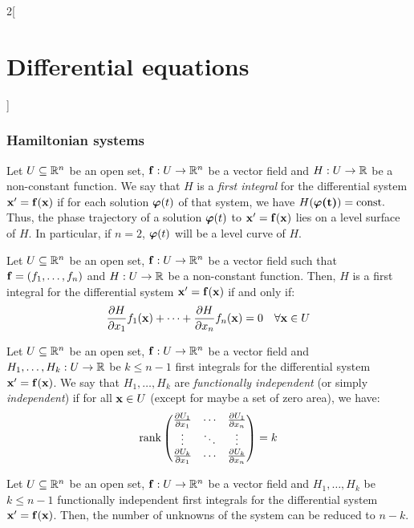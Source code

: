\documentclass[../../../main_math.tex]{subfiles}
\begin{document}
\begin{multicols}{2}[\section{Differential equations}]
  \subsubsection{Hamiltonian systems}
  \begin{definition}
    Let $U\subseteq \mathbb{R}^n$ be an open set, $\boldsymbol{\mathrm{f}}:U\rightarrow\mathbb{R}^n$ be a vector field and $H:U\rightarrow\mathbb{R}$ be a non-constant function. We say that $H$ is a \emph{first integral} for the differential system $\boldsymbol{\mathrm{x}}'=\boldsymbol{\mathrm{f}}(\boldsymbol{\mathrm{x}})$ if for each solution $\boldsymbol{\mathrm{\varphi}}(t)$ of that system, we have $H(\boldsymbol{\mathrm{\varphi(t)}})=\text{const.}$ Thus, the phase trajectory of a solution $\boldsymbol{\mathrm{\varphi}}(t)$ to $\boldsymbol{\mathrm{x}}'=\boldsymbol{\mathrm{f}}(\boldsymbol{\mathrm{x}})$ lies on a level surface of $H$. In particular, if $n=2$, $\boldsymbol{\mathrm{\varphi}}(t)$ will be a level curve of $H$.
  \end{definition}
  \begin{proposition}
    Let $U\subseteq \mathbb{R}^n$ be an open set, $\boldsymbol{\mathrm{f}}:U\rightarrow\mathbb{R}^n$ be a vector field such that $\boldsymbol{\mathrm{f}}=(f_1,\ldots,f_n)$ and $H:U\rightarrow\mathbb{R}$ be a non-constant function. Then, $H$ is a first integral for the differential system $\boldsymbol{\mathrm{x}}'=\boldsymbol{\mathrm{f}}(\boldsymbol{\mathrm{x}})$ if and only if: $$\pdv{H}{x_1}(\boldsymbol{\mathrm{x}})f_1(\boldsymbol{\mathrm{\boldsymbol{\mathrm{x}}}})+\cdots+\pdv{H}{x_n}(\boldsymbol{\mathrm{x}})f_n(\boldsymbol{\mathrm{\boldsymbol{\mathrm{x}}}})=0\quad\forall\boldsymbol{\mathrm{x}}\in U$$
  \end{proposition}
  \begin{definition}
    Let $U\subseteq \mathbb{R}^n$ be an open set, $\boldsymbol{\mathrm{f}}:U\rightarrow\mathbb{R}^n$ be a vector field and $H_1,\ldots,H_k:U\rightarrow\mathbb{R}$ be $k\leq n-1$ first integrals for the differential system $\boldsymbol{\mathrm{x}}'=\boldsymbol{\mathrm{f}}(\boldsymbol{\mathrm{x}})$. We say that $H_1,\ldots,H_k$ are \emph{functionally independent} (or simply \emph{independent}) if for all $\boldsymbol{\mathrm{x}}\in U$ (except for maybe a set of zero area), we have: $$\rank
      \begin{pmatrix}
        \pdv{U_1}{x_1}(\boldsymbol{\mathrm{x}}) & \cdots & \pdv{U_1}{x_n}(\boldsymbol{\mathrm{x}}) \\
        \vdots                 & \ddots & \vdots                 \\
        \pdv{U_k}{x_1}(\boldsymbol{\mathrm{x}}) & \cdots & \pdv{U_k}{x_n}(\boldsymbol{\mathrm{x}}) \\
      \end{pmatrix}=k$$
  \end{definition}
  \begin{proposition}
    Let $U\subseteq \mathbb{R}^n$ be an open set, $\boldsymbol{\mathrm{f}}:U\rightarrow\mathbb{R}^n$ be a vector field and $H_1,\ldots,H_k$ be $k\leq n-1$ functionally independent first integrals for the differential system $\boldsymbol{\mathrm{x}}'=\boldsymbol{\mathrm{f}}(\boldsymbol{\mathrm{x}})$. Then, the number of unknowns of the system can be reduced to $n-k$.

\end{proposition}
\end{multicols}
\end{document}
